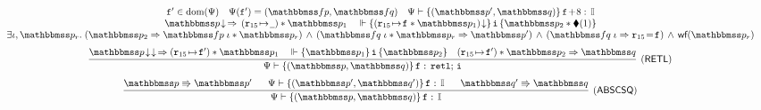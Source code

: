 \begin{figure*}[!t]
{\begin{minipage}{1\textwidth}
\[\begin{array}{c}
{                    }
                    {
                        \begin{array}{c}
                            \lab{}' \in \dom(\Cspec) \quad
                            \Cspec (\lab{}') = (\relspecpre, \relspecpost) \quad
                            \wdcblk{\Cspec}{\relastP'}
                                {\relastQ}{\lab{}\!+\!8}{\cblk} \\
                            \nxtAst{\relastP} \,\Rightarrow\,
                                (\regst{\reg{15}}{\notCare})
                                    * \relastP_1
                            \quad
                            \relwfins{\asrttm{(\regst{\reg{15}}{\lab{}} * \relastP_1)}}
                            {\simplins}{\relastP_2 \sepstar \metricAst{1}}  \\
                            \exists  \lgvl, \relastP_r. \;
                            \supimpl{\relastP_2}{\relastP'}
                                {\relspecpre \; \lgvl * \relastP_r}
                                {\relspecpost \; \lgvl * \relastP_r} \, \wedge \,
                            (\relspecpost \; \lgvl \Rightarrow \reg{15} \!=\! \lab{})
                            \,\land\,\wfFrm(\relastP_r)
                        \end{array}	
                    } \\
                    \\[-5pt]
                    \infer[(\myrule{RETL})]
                    {
                        \wdcblk{\Cspec}{\relastP}{\relastQ}{\lab{}}{\retl; \, \simplins}
                    }
                    {
                        \nxtAst{\nxtAst{\relastP}} \,\Rightarrow
                        (\regst\RAreg{\lab{}'}) \sepstar \relastP_1
                        \quad
                        \relwfins{\relastP_1}{\simplins}{\relastP_2}
                        \quad
                        (\regst\RAreg{\lab{}'}) \sepstar
                                    \relastP_2 \Rightarrow \relastQ
                    } \\
                    \\[-5pt]
                    \infer[(\myrule{ABSCSQ})]
                    {
                        \wdcblk{\Cspec}{\relastP}{\relastQ}
                            {\lab{}}{\cblk}
                    }
                    {
                        \absExec{\relastP}{\relastP'} \quad \ \
                        \wdcblk{\Cspec}{\relastP'}{\relastQ'}
                            {\lab{}}{\cblk}
                        \quad \ \
                        \absExec{\relastQ'}{\relastQ}
                    }
                \end{array}
            \]
        \end{minipage}
    }


\end{figure*}
